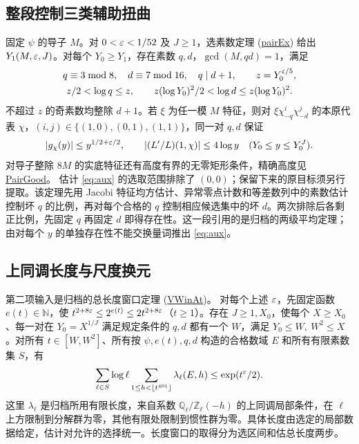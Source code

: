\documentclass[UTF8,fontset=none,a4paper,11pt]{ctexart}
\theoremstyle{definition}
\newcommand{\src}[3]{\href{https://github.com/leanprover-community/riemann-hypothesis/blob/23aebbb302010b292314d406aa97f7901d698634/src/#1.lean\#L#2}{#3}}
\begin{document}
\subsection{整段控制三类辅助扭曲}
固定 $\psi$ 的导子 $M$。对 $0<\varepsilon<1/52$ 及 $J\ge1$，选素数定理 \textup{(\src{Development/AutomorphicArithmetic/MeanSquareBounds/pairEx}{112}{pairEx})} 给出 $Y_1(M,\varepsilon,J)$。对每个 $Y_0\ge Y_1$，存在素数 $q,d$，$\gcd(M,qd)=1$，满足
\begin{gather}
 q\equiv3\bmod8,\quad d\equiv7\bmod16,\quad q\mid d+1,\qquad z=Y_0^{\varepsilon/5},\nonumber\\
 z/2<\log q\le z,\qquad z(\log Y_0)^2/2<\log d\le z(\log Y_0)^2. \label{eq:pairs}
\end{gather}
不超过 $z$ 的奇素数均整除 $d+1$。若 $\xi$ 为任一模 $M$ 特征，则对
$\xi\chi_{-q}^i\chi_{-d}^j$ 的本原代表 $\chi$，$(i,j)\in\{(1,0),(0,1),(1,1)\}$，同一对 $q,d$ 保证
\begin{equation}
 |g_\chi(y)|\le y^{1/2+\varepsilon/2},\qquad |(L'/L)(1,\chi)|\le4\log y
 \quad(Y_0\le y\le Y_0^J).\label{eq:aux}
\end{equation}
对导子整除 $8M$ 的实底特征还有高度有界的无零矩形条件，精确高度见
\src{Development/AutomorphicArithmetic/CharacterBoxes/PairGood}{12}{PairGood}。
估计 \eqref{eq:aux} 的选取范围排除了 $(0,0)$；保留下来的原目标须另行提取。该定理先用 Jacobi 特征均方估计、异常零点计数和等差数列中的素数估计控制坏 $q$ 的比例，再对每个合格的 $q$ 控制相应候选集中的坏 $d$。两次排除后各剩正比例，先固定 $q$ 再固定 $d$ 即得存在性。这一段引用的是归档的两级平均定理；由对每个 $y$ 的单独存在性不能交换量词推出 \eqref{eq:aux}。

\subsection{上同调长度与尺度换元}
第二项输入是归档的总长度窗口定理
\textup{(\src{Development/AutomorphicArithmetic/CharacterBoxes/ExistsPageN}{44}{VWinAt})}。
对每个上述 $\varepsilon$，先固定函数 $e(t)\in\mathbb N$，使
$t^{2+8\varepsilon}\le2^{e(t)}\le2t^{2+8\varepsilon}$（$t\ge1$）。存在 $J\ge1,X_0$，使每个 $X\ge X_0$、每一对在 $Y_0=X^{1/J}$ 满足规定条件的 $q,d$ 都有一个 $W$，满足 $Y_0\le W,\ W^2\le X$。对所有 $t\in[W,W^2]$、所有按 $\psi,e(t),q,d$ 构造的合格数域 $E$ 和所有有限素数集 $S$，有
\begin{equation}
 \sum_{\ell\in S}\log\ell\sum_{1\le h<\lfloor t^{401}\rfloor}
       \lambda_\ell(E,h)\le \exp(t^\varepsilon/2).\label{eq:length}
\end{equation}
这里 $\lambda_\ell$ 是归档所用有限长度，来自系数 $\mathbb Q_\ell/\mathbb Z_\ell(-h)$ 的上同调局部条件，在 $\ell$ 上方限制到分解群为零，其他有限处限制到惯性群为零。具体长度由选定的局部数据给定，估计对允许的选择统一。长度窗口的取得分为选区间和估总长度两步。
\end{document}
